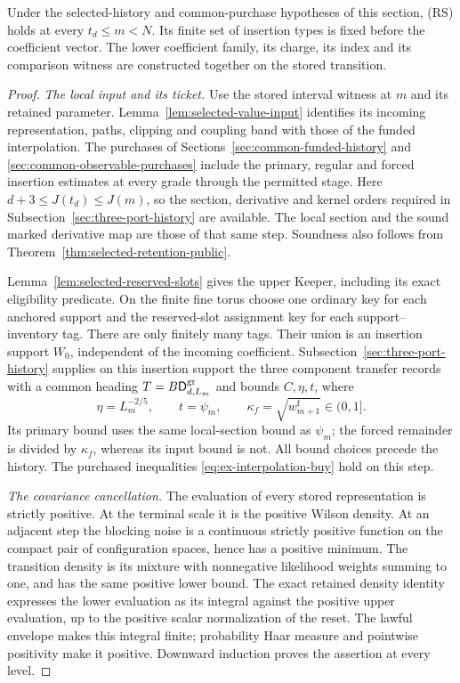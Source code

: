 \begin{proposition}
\label{prop:selected-reprise}
Under the selected-history and common-purchase hypotheses of this
section, (RS) holds at every $t_d\le m<N$. Its finite set of insertion types is fixed
before the coefficient vector. The lower coefficient family, its charge, its
index and its comparison witness are constructed together on the
stored transition.
\end{proposition}

\begin{proof}
\emph{The local input and its ticket.}
Use the stored interval witness at $m$ and its retained parameter.
Lemma~\ref{lem:selected-value-input} identifies its incoming
representation, paths, clipping and coupling band with those of the
funded interpolation. The purchases of
Sections~\ref{sec:common-funded-history} and
\ref{sec:common-observable-purchases} include the primary, regular
and forced insertion estimates at every grade through the permitted
stage. Here $d+3\le J(t_d)\le J(m)$, so the section, derivative and
kernel orders required in Subsection~\ref{sec:three-port-history} are
available. The local section and the sound marked derivative map
are those of that same step. Soundness also follows from
Theorem~\ref{thm:selected-retention-public}.

Lemma~\ref{lem:selected-reserved-slots} gives the upper Keeper,
including its exact eligibility predicate. On the finite fine torus
choose one ordinary key for each anchored support and the reserved-slot assignment key
for each support--inventory tag. There are only finitely many tags.
Their union is an insertion support $W_0$, independent of the incoming coefficient.
Subsection~\ref{sec:three-port-history} supplies on this insertion support the three
component transfer records with a common heading
$T=B\mathsf D^{\rm gr}_{d,L_m}$ and bounds $C,\eta,t$, where
\[
 \eta=L_m^{-2/5},\qquad t=\psi_m,\qquad
 \kappa_f=\sqrt{w^{\mathrm f}_{m+1}}\in(0,1].
\]
Its primary bound uses the same local-section bound as $\psi_m$;
the forced remainder is divided by $\kappa_f$, whereas its input
bound is not. All bound choices precede the history. The purchased
inequalities \eqref{eq:ex-interpolation-buy} hold on this step.

\emph{The covariance cancellation.}
The evaluation of every stored representation is strictly positive.
At the terminal scale it is the positive Wilson density. At an
adjacent step the blocking noise is a continuous strictly positive
function on the compact pair of configuration spaces, hence has a
positive minimum. The transition density is its mixture with
nonnegative likelihood weights summing to one, and has the same
positive lower bound. The exact retained density identity expresses
the lower evaluation as its integral against the positive upper
evaluation, up to the positive scalar normalization of the reset.
The lawful envelope makes this integral finite; probability Haar
measure and pointwise positivity make it positive. Downward induction
proves the assertion at every level.


\end{proof}
